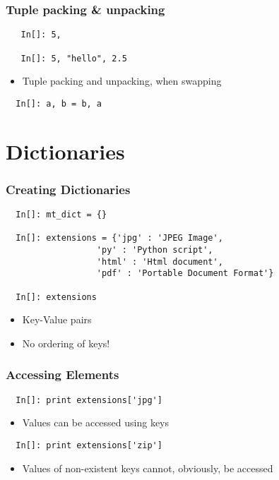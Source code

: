 \begin{frame}[fragile]
  \frametitle{Tuple packing \& unpacking}
  \begin{lstlisting}
   In[]: 5,

   In[]: 5, "hello", 2.5
  \end{lstlisting}
  \begin{itemize}
  \item Tuple packing and unpacking, when swapping
  \end{itemize}
  \begin{lstlisting}
  In[]: a, b = b, a
  \end{lstlisting}
\end{frame}

\section{Dictionaries}

\begin{frame}[fragile]
  \frametitle{Creating Dictionaries}
  \begin{lstlisting}
  In[]: mt_dict = {}

  In[]: extensions = {'jpg' : 'JPEG Image', 
                  'py' : 'Python script', 
                  'html' : 'Html document', 
                  'pdf' : 'Portable Document Format'}

  In[]: extensions
  \end{lstlisting}
  \begin{itemize}
  \item Key-Value pairs
  \item \alert{ No ordering of keys! }
  \end{itemize}
\end{frame}

\begin{frame}[fragile]
  \frametitle{Accessing Elements}
  \begin{lstlisting}
  In[]: print extensions['jpg']
  \end{lstlisting}
  \begin{itemize}
  \item Values can be accessed using keys
  \end{itemize}
  \begin{lstlisting}
  In[]: print extensions['zip']
  \end{lstlisting}
  \begin{itemize}
  \item Values of non-existent keys cannot, obviously, be accessed
  \end{itemize}
\end{frame}

